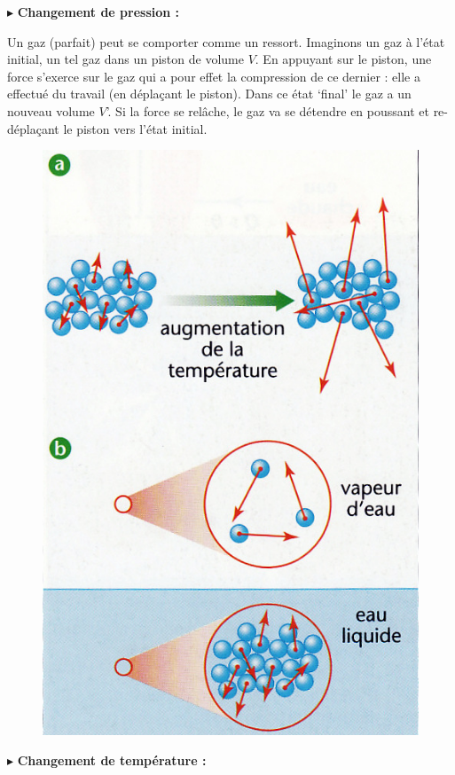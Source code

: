 \documentclass[11pt,a4paper]{article}
\begin{document}
$\blacktriangleright$ \textbf{Changement de pression : }

Un gaz (parfait) peut se comporter comme un ressort. Imaginons un gaz à l’état initial, un tel gaz dans un piston de volume $V$.  En appuyant sur le piston, une force s’exerce sur le gaz qui a pour effet la compression de ce dernier : elle a effectué du travail (en déplaçant le piston).  Dans ce état ‘final’ le gaz a un nouveau volume $V$’.  Si la force se relâche, le gaz va se détendre en poussant et re-déplaçant le piston vers l’état initial.  

\begin{figure}
  \centering
  \includegraphics[width=.95\linewidth]{imgs/p4/changetat.jpg}
\end{figure}

$\blacktriangleright$ \textbf{Changement de température : }
\end{document}
